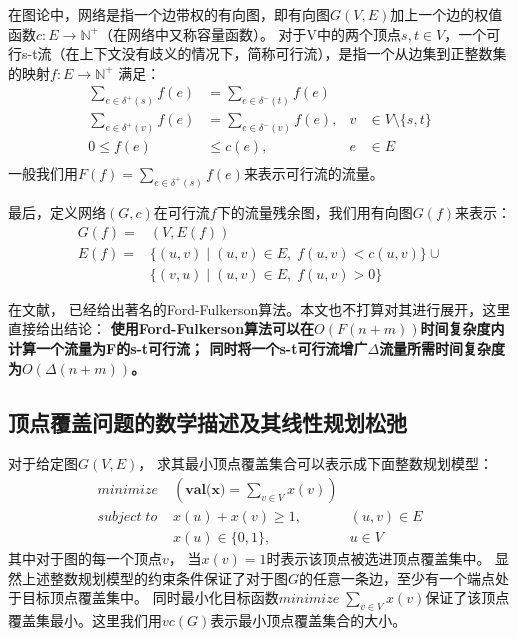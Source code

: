 在图论中，网络是指一个边带权的有向图，即有向图$G(V, E)$加上一个边的权值函数$c: E \rightarrow \mathbb{N}^+$（在网络中又称容量函数）。
对于V中的两个顶点$s, t \in V$，一个可行s-t流（在上下文没有歧义的情况下，简称可行流），是指一个从边集到正整数集的映射$f: E \rightarrow \mathbb{N}^+$ 满足：
\begin{equation} \label{EquationFlow} \begin{aligned}
  \sum_{e\in \delta^+(s)}{f(e)}&=\sum_{e\in \delta^-(t)}{f(e)}& \\
  \sum_{e\in \delta^+(v)}{f(e)}&=\sum_{e\in \delta^-(v)}{f(e)}, & v &\in V \setminus \{s, t\} \\
  0 \le f(e) &\le c(e), & e &\in E \\
\end{aligned} \end{equation}
一般我们用$F(f)=\sum_{e\in \delta^+(s)}{f(e)}$来表示可行流的流量。

最后，定义网络$(G, c)$在可行流$f$下的流量残余图，我们用有向图$G(f)$来表示：
\begin{equation*} \begin{aligned}
  G(f) = &(V, E(f)) \\
  E(f) = &\{(u,v)\;|\;(u, v) \in E,\;f(u, v) < c(u, v)\} \cup \\
  &\{(v,u)\;|\;(u, v) \in E,\;f(u, v) > 0\}
\end{aligned} \end{equation*}

在文献\cite{ford1962flows}， 已经给出著名的Ford-Fulkerson算法。本文也不打算对其进行展开，这里直接给出结论：
\textbf{使用Ford-Fulkerson算法可以在$O(F(n + m))$时间复杂度内计算一个流量为F的s-t可行流；
同时将一个s-t可行流增广$\Delta$流量所需时间复杂度为$O(\Delta(n + m))$。}

\subsection{顶点覆盖问题的数学描述及其线性规划松弛}
对于给定图$G(V, E)$， 求其最小顶点覆盖集合可以表示成下面整数规划模型：
\begin{equation} \label{ModelVC} \begin{aligned}
  minimize\; & (\textbf{val(x)} = \sum_{v \in V}{x(v)}) &\\
  subject\; to\; & x(u) + x(v) \ge 1, &(u, v) \in E \\
   & x(u) \in \{0, 1\}, & u \in V
\end{aligned} \end{equation}
其中对于图的每一个顶点$v$， 当$x(v) = 1$时表示该顶点被选进顶点覆盖集中。
显然上述整数规划模型的约束条件保证了对于图$G$的任意一条边，至少有一个端点处于目标顶点覆盖集中。
同时最小化目标函数$minimize\; \sum_{v \in V}{x(v)}$保证了该顶点覆盖集最小。这里我们用$vc(G)$表示最小顶点覆盖集合的大小。

